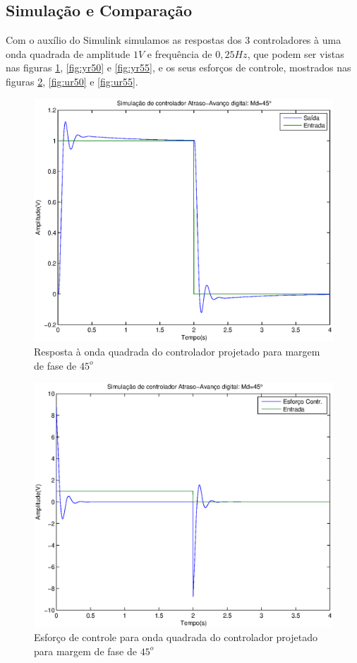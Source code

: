 \documentclass{article}
\begin{document}
\subsection{Simulação e Comparação}
Com o auxílio do Simulink simulamos as respostas dos 3 controladores à uma onda quadrada de amplitude $1V$ e frequência de $0,25Hz$, que podem ser vistas nas figuras \ref{fig:yr45}, \ref{fig:yr50} e \ref{fig:yr55}, e os seus esforços de controle, mostrados nas figuras \ref{fig:ur45}, \ref{fig:ur50} e \ref{fig:ur55}.
\begin{figure}[H]
	\centering
	\includegraphics[width=0.8\linewidth]{yr45}
	\caption{Resposta à onda quadrada do controlador projetado para margem de fase de $45^o$}
	\label{fig:yr45}
\end{figure}
\begin{figure}[H]
	\centering
	\includegraphics[width=0.8\linewidth]{ur45}
	\caption{Esforço de controle para onda quadrada do controlador projetado para margem de fase de $45^o$}
	\label{fig:ur45}
\end{figure}
\end{document}
